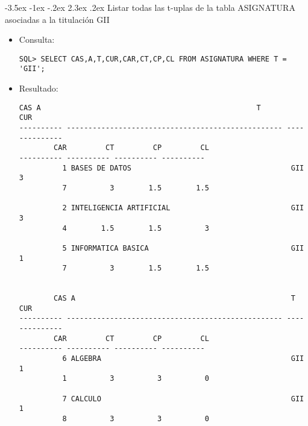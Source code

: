 \documentclass[11pt]{report}
\makeatletter
\renewcommand\chapter{\@startsection{chapter}{0}{\z@}%
    {-3.5ex \@plus -1ex \@minus -.2ex}%
    {2.3ex \@plus.2ex}%
    {\normalfont\Large\bfseries}}
\makeatother
\begin{document}
\chapter{Listar todas las t-uplas de la tabla ASIGNATURA asociadas a la titulación GII}
\begin{itemize}
  \item Consulta:
  \begin{verbatim}
SQL> SELECT CAS,A,T,CUR,CAR,CT,CP,CL FROM ASIGNATURA WHERE T = 'GII';
  \end{verbatim}
  \item{Resultado:}
  \begin{verbatim}
CAS A                                                  T           CUR   
---------- -------------------------------------------------- ---- ----------   
        CAR         CT         CP         CL                                     
---------- ---------- ---------- ----------                                     
          1 BASES DE DATOS                                     GII           3   
          7          3        1.5        1.5                                     
                                                                                
          2 INTELIGENCIA ARTIFICIAL                            GII           3   
          4        1.5        1.5          3                                     
                                                                                
          5 INFORMATICA BASICA                                 GII           1   
          7          3        1.5        1.5                                     
                                                                                

        CAS A                                                  T           CUR   
---------- -------------------------------------------------- ---- ----------   
        CAR         CT         CP         CL                                     
---------- ---------- ---------- ----------                                     
          6 ALGEBRA                                            GII           1   
          1          3          3          0                                     
                                                                                
          7 CALCULO                                            GII           1   
          8          3          3          0                                     
                                                                                

\end{verbatim}
\end{itemize}
\end{document}
